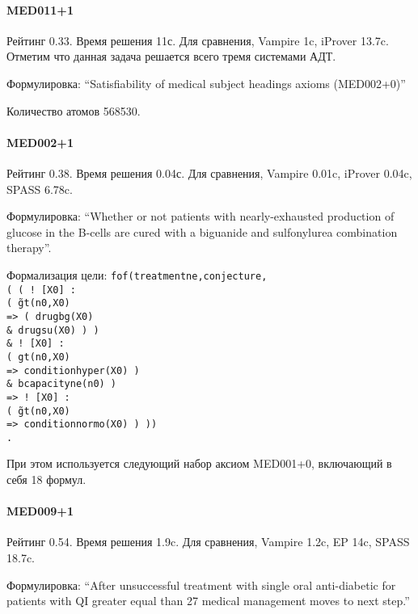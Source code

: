 \paragraph{MED011+1}
Рейтинг 0.33. Время решения 11с. Для сравнения, Vampire 1c, iProver 13.7c. Отметим что данная задача решается всего тремя системами АДТ.

Формулировка: ``Satisfiability of medical subject headings axioms (MED002+0)''

Количество атомов 568530.


\paragraph{MED002+1}
Рейтинг 0.38. Время решения 0.04с. Для сравнения, Vampire 0.01c, iProver 0.04c, SPASS 6.78c.

Формулировка: ``Whether or not patients with nearly-exhausted production of glucose in the B-cells are cured with a biguanide and sulfonylurea combination therapy''.

Формализация цели:
\texttt{fof(treatmentne,conjecture,\\
    ( ( ! [X0] :\\
          ( \~ gt(n0,X0)\\
         => ( drugbg(X0)\\
            \& drugsu(X0) ) )\\
      \& ! [X0] :\\
          ( gt(n0,X0)\\
         => conditionhyper(X0) )\\
      \& bcapacityne(n0) )\\
   => ! [X0] :\\
        ( \~ gt(n0,X0)\\
       => conditionnormo(X0) ) ))\\.
       }

При этом используется следующий набор аксиом MED001+0, включающий в себя 18 формул.

\paragraph{MED009+1}
Рейтинг 0.54. Время решения 1.9c. Для сравнения, Vampire 1.2c, EP 14c, SPASS 18.7c.

Формулировка: ``After unsuccessful treatment with single oral anti-diabetic for patients with QI greater equal than 27 medical management moves to next step.''

